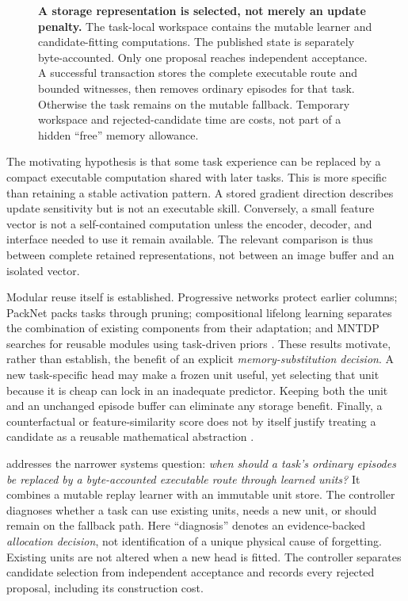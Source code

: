 \documentclass{article}
\begin{document}
\begin{figure}[t]
\centering
{}
\caption{\textbf{A storage representation is selected, not merely an update penalty.} The task-local workspace contains the mutable learner and candidate-fitting computations. The published state is separately byte-accounted. Only one proposal reaches independent acceptance. A successful transaction stores the complete executable route and bounded witnesses, then removes ordinary episodes for that task. Otherwise the task remains on the mutable fallback. Temporary workspace and rejected-candidate time are costs, not part of a hidden ``free'' memory allowance.}
\label{fig:system}
\end{figure}

The motivating hypothesis is that some task experience can be replaced by a compact executable computation shared with later tasks. This is more specific than retaining a stable activation pattern. A stored gradient direction describes update sensitivity but is not an executable skill. Conversely, a small feature vector is not a self-contained computation unless the encoder, decoder, and interface needed to use it remain available. The relevant comparison is thus between complete retained representations, not between an image buffer and an isolated vector.

Modular reuse itself is established. Progressive networks protect earlier columns; PackNet packs tasks through pruning; compositional lifelong learning separates the combination of existing components from their adaptation; and MNTDP searches for reusable modules using task-driven priors \cite{rusu2016,mallya2018,mendez2021,veniat2021}. These results motivate, rather than establish, the benefit of an explicit \emph{memory-substitution decision}. A new task-specific head may make a frozen unit useful, yet selecting that unit because it is cheap can lock in an inadequate predictor. Keeping both the unit and an unchanged episode buffer can eliminate any storage benefit. Finally, a counterfactual or feature-similarity score does not by itself justify treating a candidate as a reusable mathematical abstraction \cite{geiger2022,geiger2024}.

\famp{} addresses the narrower systems question: \emph{when should a task's ordinary episodes be replaced by a byte-accounted executable route through learned units?} It combines a mutable replay learner with an immutable unit store. The controller diagnoses whether a task can use existing units, needs a new unit, or should remain on the fallback path. Here ``diagnosis'' denotes an evidence-backed \emph{allocation decision}, not identification of a unique physical cause of forgetting. Existing units are not altered when a new head is fitted. The controller separates candidate selection from independent acceptance and records every rejected proposal, including its construction cost.
\end{document}

